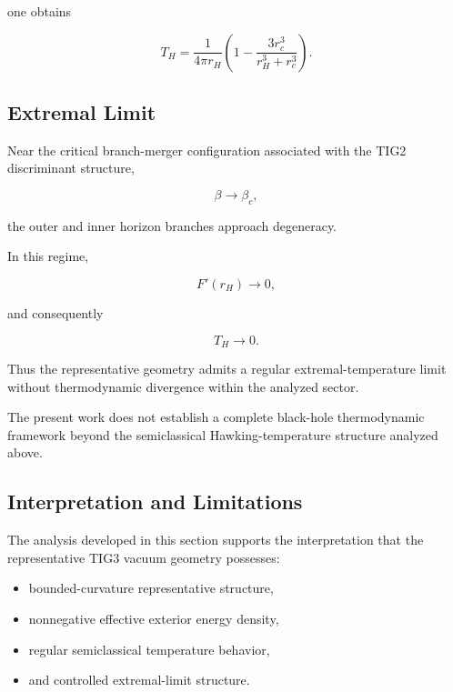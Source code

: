 one obtains

\begin{equation}
T_H
=
\frac{1}{4\pi r_H}
\left(
1
-
\frac{3r_c^3}{r_H^3+r_c^3}
\right).
\label{eq:thfinal}
\end{equation}


\subsection{Extremal Limit}

Near the critical branch-merger configuration associated with the TIG2 discriminant structure,

\begin{equation}
\beta \rightarrow \beta_c,
\end{equation}

the outer and inner horizon branches approach degeneracy.

In this regime,

\begin{equation}
F'(r_H)\rightarrow 0,
\end{equation}

and consequently

\begin{equation}
T_H \rightarrow 0.
\end{equation}

Thus the representative geometry admits a regular extremal-temperature limit without thermodynamic divergence within the analyzed sector.

The present work does not establish a complete black-hole thermodynamic framework beyond the semiclassical Hawking-temperature structure analyzed above.


\subsection{Interpretation and Limitations}

The analysis developed in this section supports the interpretation that the representative TIG3 vacuum geometry possesses:

\begin{itemize}[leftmargin=0.6cm]
\item bounded-curvature representative structure,
\item nonnegative effective exterior energy density,
\item regular semiclassical temperature behavior,
\item and controlled extremal-limit structure.
\end{itemize}

